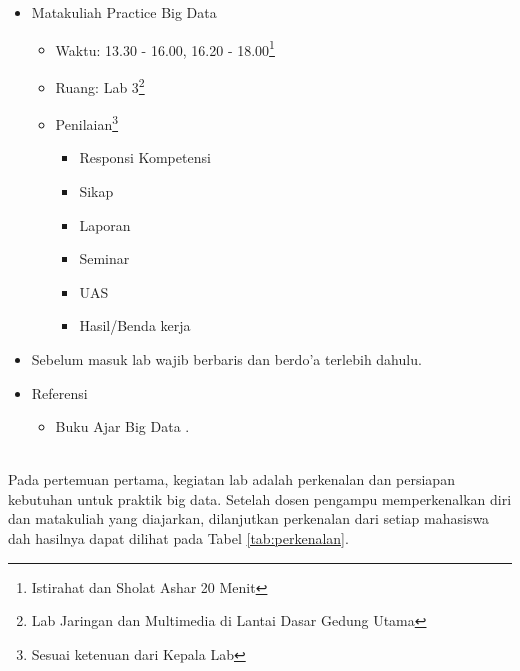 \documentclass[a4paper]{tufte-handout}
\begin{document}

\begin{maybe}
    \begin{itemize}
    	\item Matakuliah Practice Big Data
    	\begin{itemize}
    	\item Waktu: 13.30 - 16.00, 16.20 - 18.00\footnote{Istirahat dan Sholat Ashar 20 Menit}
    	\item Ruang: Lab 3\footnote{Lab Jaringan dan Multimedia di Lantai Dasar Gedung Utama}
    	\item Penilaian\footnote{Sesuai ketenuan dari Kepala Lab}
    	\begin{itemize}
    	\item Responsi Kompetensi
    	\item Sikap
    	\item Laporan
    	\item Seminar
    	\item UAS
    	\item Hasil/Benda kerja
    	\end{itemize}
    	\end{itemize}
    	\item Sebelum masuk lab wajib berbaris dan berdo'a terlebih dahulu.
    	\item Referensi
    	\begin{itemize}
    		\item Buku Ajar Big Data \citep{Mursyidah2020}.
    	\end{itemize}
    \end{itemize}
\end{maybe}

\newpage
{}

 \\
Pada pertemuan pertama, kegiatan lab adalah perkenalan dan persiapan kebutuhan untuk praktik big data. Setelah dosen pengampu memperkenalkan diri dan matakuliah yang diajarkan, dilanjutkan perkenalan dari setiap mahasiswa dah hasilnya dapat dilihat pada Tabel \ref{tab:perkenalan}.
\end{document}
